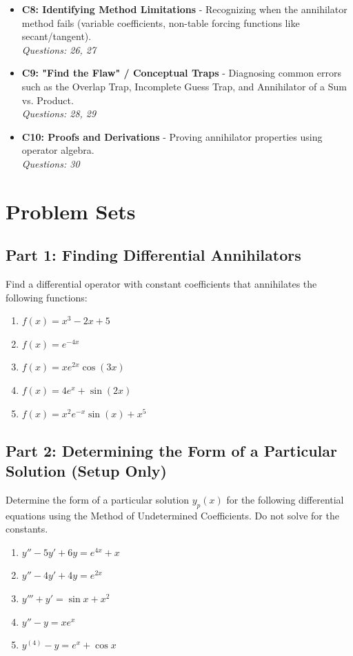 \documentclass[11pt]{article}
\begin{document}
\begin{itemize}
    \textit{Questions: 24, 25}
    \item \textbf{C8: Identifying Method Limitations} - Recognizing when the annihilator method fails (variable coefficients, non-table forcing functions like secant/tangent). \\
    \textit{Questions: 26, 27}
    \item \textbf{C9: "Find the Flaw" / Conceptual Traps} - Diagnosing common errors such as the Overlap Trap, Incomplete Guess Trap, and Annihilator of a Sum vs. Product. \\
    \textit{Questions: 28, 29}
    \item \textbf{C10: Proofs and Derivations} - Proving annihilator properties using operator algebra. \\
    \textit{Questions: 30}
\end{itemize}

\newpage

\section{Problem Sets}

\subsection*{Part 1: Finding Differential Annihilators}
Find a differential operator with constant coefficients that annihilates the following functions:
\begin{enumerate}
    \item $f(x) = x^3 - 2x + 5$
    \item $f(x) = e^{-4x}$
    \item $f(x) = x e^{2x} \cos(3x)$
    \item $f(x) = 4e^{x} + \sin(2x)$
    \item $f(x) = x^2 e^{-x} \sin(x) + x^5$
\end{enumerate}

\subsection*{Part 2: Determining the Form of a Particular Solution (Setup Only)}
Determine the form of a particular solution $y_p(x)$ for the following differential equations using the Method of Undetermined Coefficients. Do not solve for the constants.
\begin{enumerate}[resume]
    \item $y'' - 5y' + 6y = e^{4x} + x$
    \item $y'' - 4y' + 4y = e^{2x}$
    \item $y''' + y' = \sin x + x^2$
    \item $y'' - y = x e^x$
    \item $y^{(4)} - y = e^x + \cos x$
\end{enumerate}
\end{document}
